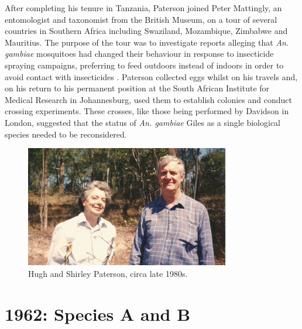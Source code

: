 \documentclass[a4paper,11pt,abstracton,hidelinks]{scrartcl}
\begin{document}
After completing his tenure in Tanzania, Paterson joined Peter Mattingly, an entomologist and taxonomist from the British Museum, on a tour of several countries in Southern Africa including Swaziland, Mozambique, Zimbabwe and Mauritius.
%
The purpose of the tour was to investigate reports alleging that \textit{An. gambiae} mosquitoes had changed their behaviour in response to insecticide spraying campaigns, preferring to feed outdoors instead of indoors in order to avoid contact with insecticides \citep{Mattingly1963}.
%
Paterson collected eggs whilst on his travels and, on his return to his permanent position at the South African Institute for Medical Research in Johannesburg, used them to establish colonies and conduct crossing experiments.
%
These crosses, like those being performed by Davidson in London, suggested that the status of \textit{An. gambiae} Giles as a single biological species needed to be reconsidered.


\begin{figure}[t]
\centering
\includegraphics[width=0.8\textwidth]{artwork/chapter2/Hugh_and_Shirley_Paterson_Brisbane.jpg}
\caption{Hugh and Shirley Paterson, circa late 1980s.}
\end{figure}


\section{1962: Species A and B}
\end{document}
